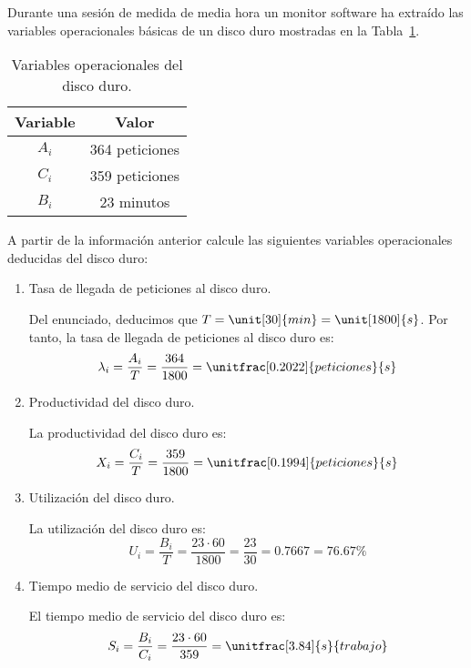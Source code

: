 \begin{ejercicio}\label{ej:5.4}
    Durante una sesión de medida de media hora un monitor software ha extraído las variables operacionales básicas de un disco duro mostradas en la Tabla~\ref{tab:5.4}.
    \begin{table}[h]
        \centering
        \begin{tabular}{|c|c|}
            \hline
            Variable & Valor \\
            \hline
            $A_i$ & 364 peticiones \\
            $C_i$ & 359 peticiones \\
            $B_i$ & 23 minutos \\
            \hline
        \end{tabular}
        \caption{Variables operacionales del disco duro.}
        \label{tab:5.4}
    \end{table}
    A partir de la información anterior calcule las siguientes variables operacionales deducidas del disco duro:
    \begin{enumerate}
        \item Tasa de llegada de peticiones al disco duro.
        
        Del enunciado, deducimos que $T = \unit[30]{min} = \unit[1800]{s}$. Por tanto, la tasa de llegada de peticiones al disco duro es:
        \begin{equation*}
            \lambda_i = \dfrac{A_i}{T} = \dfrac{364}{1800} = \unitfrac[0.2022]{peticiones}{s}
        \end{equation*}
        \item Productividad del disco duro.
        
        La productividad del disco duro es:
        \begin{equation*}
            X_i = \dfrac{C_i}{T} = \dfrac{359}{1800} = \unitfrac[0.1994]{peticiones}{s}
        \end{equation*}
        \item Utilización del disco duro.
        
        La utilización del disco duro es:
        \begin{equation*}
            U_i = \dfrac{B_i}{T} = \dfrac{23\cdot60}{1800} = \dfrac{23}{30} = 0.7667 = 76.67\%
        \end{equation*}
        \item Tiempo medio de servicio del disco duro.
        
        El tiempo medio de servicio del disco duro es:
        \begin{equation*}
            S_i = \dfrac{B_i}{C_i} = \dfrac{23\cdot60}{359} = \unitfrac[3.84]{s}{trabajo}
        \end{equation*}
    \end{enumerate}
\end{ejercicio}
